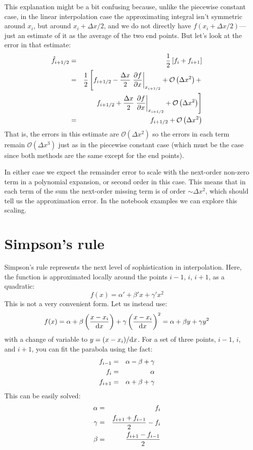 This explanation might be a bit confusing because, unlike the
piecewise constant case, in the linear interpolation case the
approximating integral isn't symmetric around $x_i$, but around
$x_i+\Delta x / 2$, and we do not directly have $f(x_i + \Delta x
/2)$---just an estimate of it as the average of the two end points.
But let's look at the error in that estimate:
\begin{eqnarray}
\hat f_{i+1/2} &=& \frac{1}{2} \left[f_i + f_{i+1}\right]\cr
&=& \frac{1}{2} \left[
f_{i+1/2} - \frac{\Delta x}{2} \left.\frac{\partial f}{\partial x}\right|_{x_{i+1/2}} +
 \mathcal{O}\left(\Delta x^2\right) + \right. \cr
 & & 
\left. f_{i+1/2} + \frac{\Delta x}{2} \left.\frac{\partial f}{\partial x}\right|_{x_{i+1/2}} +
 \mathcal{O}\left(\Delta x^2\right) \right] \cr
&= & f_{i+1/2} + \mathcal{O}\left(\Delta x^2\right)
\end{eqnarray}
That is, the errors in this estimate are $\mathcal{O}(\Delta x^2)$ so
the errors in each term remain $\mathcal{O}(\Delta x^3)$ just as in
the piecewise constant case (which must be the case since both methods
are the same except for the end points).

In either case we expect the remainder error to scale with the
next-order non-zero term in a polynomial expansion, or second order in
this case. This means that in each term of the sum the next-order
missing term is of order $\sim \Delta x^2$, which should tell us the
approximation error. In the notebook examples we can explore this
scaling.

\section{Simpson's rule}

Simpson's rule represents the next level of sophistication in
interpolation. Here, the function is approximated locally around the
points $i-1$, $i$, $i+1$, as a quadratic:
\begin{equation}
f(x) = \alpha' + \beta' x + \gamma' x^2
\end{equation}
This is not a very convenient form. Let us instead use:
\begin{equation}
  f(x) = \alpha + \beta \left(\frac{x - x_i}{{\rm d}x}\right) +
  \gamma \left(\frac{x - x_i}{{\rm d}x}\right)^2 = 
  \alpha + \beta y
  + \gamma y^2
\end{equation}
with a change of variable to $y = (x-x_i)/{\rm d}x$.  For a set of
three points, $i-1$, $i$, and $i+1$, you can fit the parabola using
the fact:
\begin{eqnarray}
f_{i-1} &=& \alpha - \beta + \gamma \cr
f_{i} &=& \alpha \cr
f_{i+1} &=& \alpha + \beta + \gamma
\end{eqnarray}
This can be easily solved:
\begin{eqnarray}
\alpha &=& f_i \cr
\gamma &=& \frac{f_{i+1}+f_{i-1}}{2} - f_i \cr
\beta &=& \frac{f_{i+1}-f_{i-1}}{2}
\end{eqnarray}

